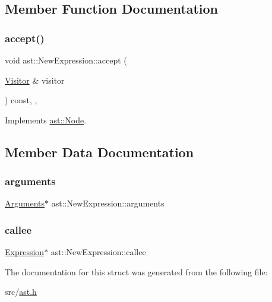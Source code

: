 \subsection{Member Function Documentation}
\mbox{\label{structast_1_1_new_expression_a2bbbe32ce252983e8e67f228790751f7}} 
\subsubsection{\texorpdfstring{accept()}{accept()}}
{\footnotesize\ttfamily void ast\+::\+New\+Expression\+::accept (\begin{DoxyParamCaption}\item[{\hyperlink{structast_1_1_visitor}{Visitor} \&}]{visitor }\end{DoxyParamCaption}) const\hspace{0.3cm}{\ttfamily [inline]}, {\ttfamily [override]}, {\ttfamily [virtual]}}



Implements \hyperlink{structast_1_1_node_abc089ee6caaf06a4445ebdd8391fdebc}{ast\+::\+Node}.



\subsection{Member Data Documentation}
\mbox{\label{structast_1_1_new_expression_a9ef033d5f7aed8595bb4e97f8d955b57}} 
\subsubsection{\texorpdfstring{arguments}{arguments}}
{\footnotesize\ttfamily \hyperlink{structast_1_1_arguments}{Arguments}$\ast$ ast\+::\+New\+Expression\+::arguments}

\mbox{\label{structast_1_1_new_expression_a16da596cbcdc3de139f74dffd2611993}} 
\subsubsection{\texorpdfstring{callee}{callee}}
{\footnotesize\ttfamily \hyperlink{structast_1_1_expression}{Expression}$\ast$ ast\+::\+New\+Expression\+::callee}



The documentation for this struct was generated from the following file\+:\begin{DoxyCompactItemize}
\item 
src/\hyperlink{ast_8h}{ast.\+h}\end{DoxyCompactItemize}
